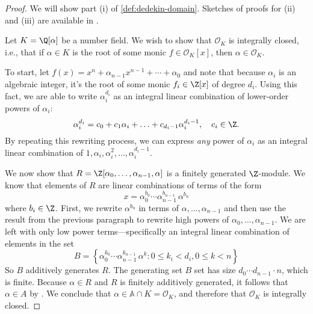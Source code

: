 \begin{proof}
    We will show part (i) of \autoref{def:dedekin-domain}. Sketches of proofs for (ii) and (iii) are available in \cite[40]{marcus}.

    Let $K = \Q[\alpha]$ be a number field. We wish to show that $\mathcal O_K$ is integrally closed, i.e., that if $\alpha \in K$ is the root of some monic $f \in \mathcal O_K[x]$, then $\alpha \in \mathcal O_K$.

    To start, let $f(x) = x^n + \alpha_{n-1}x^{n-1} + \cdots + \alpha_0$ and note that because $\alpha_i$ is an algebraic integer, it's the root of some monic $f_i \in \Z[x]$ of degree $d_i$. Using this fact, we are able to write $\alpha_i^{d_i}$ as an integral linear combination of lower-order powers of $\alpha_i$:
    \begin{equation}
        \alpha_i^{d_i} = c_0 + c_1 \alpha_i + \ldots + c_{d_i-1} \alpha_i^{d_i-1},
        \quad c_i \in \Z.
    \end{equation}
    By repeating this rewriting process, we can express \emph{any} power of $\alpha_i$ as an integral linear combination of $1, \alpha_i, \alpha_i^2, \ldots, \alpha_i^{d_i - 1}$.

    We now show that $R = \Z[\alpha_0, \ldots, \alpha_{n-1}, \alpha]$ is a finitely generated $\Z$-module. We know that elements of $R$ are linear combinations of terms of the form
    \begin{equation}
        x = \alpha_0^{b_0} \cdots \alpha_{n-1}^{b_{n-1}} \, \alpha^{b_n}
    \end{equation}
    where $b_i \in \Z$.
    First, we rewrite $\alpha^{b_n}$ in terms of $\alpha, \ldots, \alpha_{n-1}$ and then use the result from the previous paragraph to rewrite high powers of $\alpha_0, \ldots, \alpha_{n-1}$.
    We are left with only low power terms---specifically an integral linear combination of elements in the set
    \begin{equation}
        B = \left\{
        \alpha_0^{k_0} \cdots \alpha_{n-1}^{k_{n-1}} \, \alpha^k
        : 0 \leq k_i < d_i, 0 \leq k < n
        \right\}
    \end{equation}
    So $B$ additively generates $R$. The generating set $B$ set has size $d_0 \cdots d_{n-1} \cdot n$, which is finite. Because $\alpha \in R$ and $R$ is finitely additively generated, it follows that $\alpha \in A$ by \cite[Theorem 2.2]{marcus}. We conclude that $\alpha \in \mathbb A \cap K = \mathcal O_K$, and therefore that $\mathcal O_K$ is integrally closed.
\end{proof}

